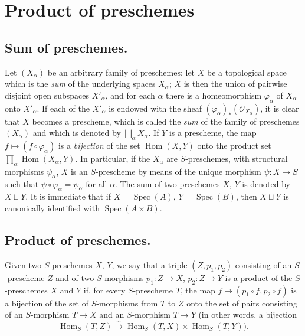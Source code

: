 \section{Product of preschemes}
\label{section:I.3}

\subsection{Sum of preschemes.}
\label{subsection:I.3.1}

Let $(X_\alpha)$ be an arbitrary family of preschemes; let $X$ be a topological
space which is the \emph{sum} of the underlying spaces $X_\alpha$; $X$ is then
the union of pairwise disjoint open subspaces $X'_\alpha$, and for
each $\alpha$ there is a homeomorphism $\varphi_\alpha$ of $X_\alpha$ onto
$X'_\alpha$. If each of the $X'_\alpha$ is endowed with the sheaf
$(\varphi_\alpha)_*(\mathscr{O}_{X_\alpha})$, it is clear that $X$ becomes a
prescheme, which is called the \emph{sum} of the family of preschemes $(X_\alpha)$
and which is denoted by $\bigsqcup_\alpha X_\alpha$. If $Y$ is a prescheme,
the map $f\mapsto(f\circ\varphi_\alpha)$ is a \emph{bijection} of
the set $\operatorname{Hom}(X,Y)$ onto the product set
$\prod_\alpha\operatorname{Hom}(X_\alpha,Y)$. In particular, if the
$X_\alpha$ are $S$-preschemes, with structural morphisms $\psi_\alpha$,
$X$ is an $S$-prescheme by means of the unique morphism $\psi:X\to S$ such that
$\psi\circ\varphi_\alpha=\psi_\alpha$ for all $\alpha$. The sum of two
preschemes $X$, $Y$ is denoted by $X\sqcup Y$. It is immediate that if
$X=\operatorname{Spec}(A)$, $Y=\operatorname{Spec}(B)$, then $X\sqcup Y$
is canonically identified with $\operatorname{Spec}(A\times B)$.

\subsection{Product of preschemes.}
\label{subsection:I.3.2}

\begin{definition}[3.2.1]
\label{I.3.2.1}
Given two $S$-preschemes $X$, $Y$, we say that a triple
$(Z,p_1,p_2)$ consisting of an $S$-prescheme $Z$ and of two $S$-morphisms
$p_1:Z\to X$, $p_2:Z\to Y$ is a product of the
$S$-preschemes $X$ and $Y$ if, for every $S$-prescheme $T$, the map
$f\mapsto(p_1\circ f,p_2\circ f)$ is a bijection of the set of
$S$-morphisms from $T$ to $Z$ onto the set of pairs consisting of an
$S$-morphism $T\to X$ and an $S$-morphism $T\to Y$ (in other words, a
bijection
\[
  \operatorname{Hom}_S(T,Z)\xrightarrow{\sim}
  \operatorname{Hom}_S(T,X)\times\operatorname{Hom}_S(T,Y)).
\]
\end{definition}

